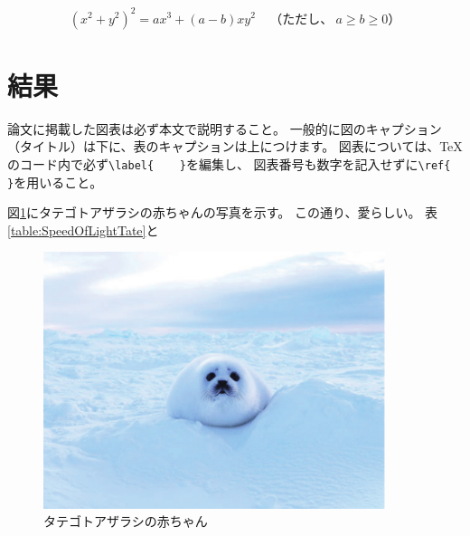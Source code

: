 \documentclass[11pt,a4paper]{ltjsreport}
\begin{document}
\begin{eqnarray}
    \label{eq:egg_equation}
    (x^2 + y^2)^2 = ax^3 + (a - b)xy^2 \ \ \ \ \ （ただし、\ a \ge b \ge 0）
\end{eqnarray}


\section{結果}
論文に掲載した図表は必ず本文で説明すること。
一般的に図のキャプション（タイトル）は下に、表のキャプションは上につけます。
図表については、TeXのコード内で必ず\verb#\label{    }#を編集し、
図表番号も数字を記入せずに\verb#\ref{    }#を用いること。

図\ref{figure:Phoca_groenlandica}にタテゴトアザラシの赤ちゃんの写真を示す。
この通り、愛らしい。
表\ref{table:SpeedOfLightTate}と


\begin{figure}[htbp]
    \begin{center}
        \includegraphics[width=100mm]{hoca_groenlandica.pdf}
        \caption{タテゴトアザラシの赤ちゃん}
        \label{figure:Phoca_groenlandica}
    \end{center}
\end{figure}
\end{document}
